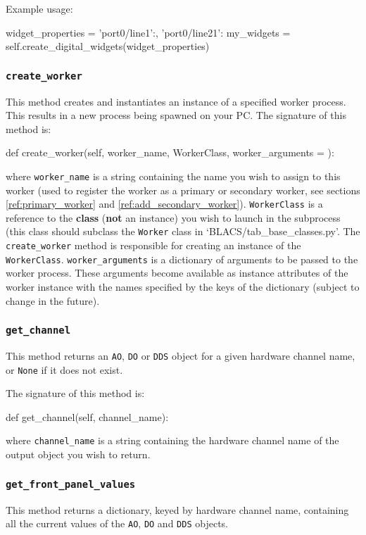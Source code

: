\documentclass[12pt]{article}
\begin{document}
Example usage:
\begin{python}
widget_properties = {'port0/line1':{},
                     'port0/line21':{}
                    }
my_widgets = self.create_digital_widgets(widget_properties)
\end{python}


\subsubsection{\texttt{create\_worker}}\label{ref:create_worker}
This method creates and instantiates an instance of a specified worker process.
This results in a new process being spawned on your PC.
The signature of this method is:
\begin{python}
def create_worker(self, worker_name, WorkerClass, worker_arguments = {}):
\end{python}
where \texttt{worker\_name} is a string containing the name you wish to assign to this worker (used to register the worker as a primary or secondary worker, see sections \ref{ref:primary_worker} and \ref{ref:add_secondary_worker}).
\texttt{WorkerClass} is a reference to the \textbf{class} (\textbf{not} an instance) you wish to launch in the subprocess (this class should subclass the \texttt{Worker} class in `BLACS/tab\_base\_classes.py'. The \texttt{create\_worker} method is responsible for creating an instance of the \texttt{WorkerClass}.
\texttt{worker\_arguments} is a dictionary of arguments to be passed to the worker process. These arguments become available as instance attributes of the worker instance with the names specified by the keys of the dictionary (subject to change in the future).

\subsubsection{\texttt{get\_channel}}\label{ref:get_channel}
This method returns an \texttt{AO}, \texttt{DO} or \texttt{DDS} object for a given hardware channel name, or \texttt{None} if it does not exist.

The signature of this method is:
\begin{python}
def get_channel(self, channel_name):
\end{python}
where \texttt{channel\_name} is a string containing the hardware channel name of the output object you wish to return.

\subsubsection{\texttt{get\_front\_panel\_values}}\label{ref:get_front_panel_values}
This method returns a dictionary, keyed by hardware channel name, containing all the current values of the \texttt{AO}, \texttt{DO} and \texttt{DDS} objects.
\end{document}

